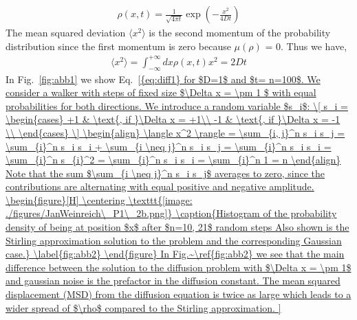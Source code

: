 \documentclass[12pt]{article}
\begin{document}
\begin{align}
    \rho (x, t) = \frac{1}{\sqrt{4 \pi t}} \exp{   \left( -\frac{x^2}{4Dt} \right) }
\end{align}  
The mean squared deviation $  \langle x^2 \rangle $ is the second momentum of the 
probability distribution since the first momentum is zero because $\mu(\rho)$ = 0.
Thus we have,
\begin{align}
  \langle x^2 \rangle = \int_{-\infty}^{+\infty} dx \rho (x, t) x^2 = 2 Dt
  \label{eq:diff1}
\end{align}
In Fig.~\ref{fig:abb1} we show Eq.~\ref{{eq:diff1} for $D=1$ and $t= n=100$.
 
 
 
 
 
We consider a walker with steps of fixed size $\Delta x = \pm 1 $ with equal probabilities for  both directions.
We introduce a random variable $s_i$:
\[   
s_i = 
     \begin{cases}
       +1 & \text{, if }\Delta x = +1\\
       -1 & \text{, if }\Delta x = -1 \\
     \end{cases}
\]
 
 
 
\begin{align}
  \langle x^2 \rangle  = \sum_{i, j}^n s_i s_j = \sum_{i}^n s_i s_i  + \sum_{i \neq j}^n s_i s_j
  = \sum_{i}^n s_i s_i  = \sum_{i}^n s_{i}^2 = \sum_{i}^n s_i s_i  = \sum_{i}^n 1 = n  
\end{align}
Note that the sum $\sum_{i \neq j}^n s_i s_j$ averages to zero, since the contributions are alternating with
equal positive and negative amplitude.
 
 
 
 
\begin{figure}[H]
  \centering
    \texttt{[image: ./figures/JanWeinreich\_P1\_2b.png]}
    \caption{Histogram of the probability density of being at position $x$ after $n=10, 21$ random steps
            Also shown is the Stirling approximation solution to the problem and the corresponding 
            Gaussian case.}
    \label{fig:abb2}
  \end{figure}
 
 
 
 
 
 
In Fig.~\ref{fig:abb2} we see that the main difference between the solution to the diffusion
problem with $\Delta x = \pm 1$ and gaussian noise is the prefactor in the diffusion constant.
The mean squared displacement (MSD) from the diffusion equation is twice as large which leads to
a wider spread of $\rho$ compared to the Stirling approximation.
 
}
\end{document}
